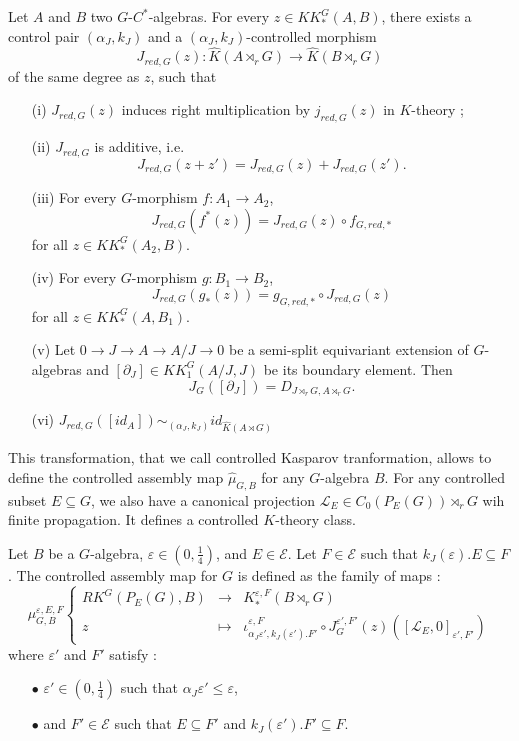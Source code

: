 \begin{prop}
Let $A$ and $B$ two $G$-$C^*$-algebras. For every $z\in KK^G_*(A,B)$, there exists a control pair $(\alpha_J,k_J)$ and a $(\alpha_J,k_J)$-controlled morphism
\[J_{red,G}(z) : \hat K(A\rtimes_r G)\rightarrow \hat K(B\rtimes_r G)\]
of the same degree as $z$, such that
\begin{enumerate}
\item[(i)] $J_{red,G}(z)$ induces right multiplication by $j_{red,G}(z)$ in $K$-theory ;
\item[(ii)] $J_{red,G}$ is additive, i.e.
\[J_{red,G}(z+z')=J_{red,G}(z)+J_{red,G}(z').\]
\item[(iii)] For every $G$-morphism $f : A_1\rightarrow A_2$,
\[J_{red,G}(f^*(z))=J_{red,G}(z)\circ f_{G,red,*}\] for all $z\in KK_*^G(A_2,B)$.
\item[(iv)] For every $G$-morphism $g : B_1\rightarrow B_2$,
\[J_{red,G}(g_*(z))= g_{G,red,*}\circ J_{red,G}(z)\] for all $z\in KK_*^G(A,B_1)$.
\item[(v)] Let $0\rightarrow J\rightarrow A\rightarrow A/J\rightarrow 0$ be a semi-split equivariant extension of $G$-algebras and $[\partial_J]\in KK_1^G(A/J,J)$ be its boundary element. Then 
\[J_G([\partial_J])=D_{J\rtimes_r G,A\rtimes_rG}.\] 
\item[(vi)] $J_{red,G}([id_A]) \sim_{(\alpha_J,k_J)} id_{\hat K(A\rtimes G)}$
\end{enumerate}
\end{prop} 

This transformation, that we call controlled Kasparov tranformation, allows to define the controlled assembly map $\hat\mu_{G,B}$ for any $G$-algebra $B$. For any controlled subset $E\subseteq G$, we also have a canonical projection $\mathcal L_E\in C_0(P_E(G))\rtimes_r G$ wih finite propagation. It defines a controlled $K$-theory class.

\begin{definition}
Let $B$ be a $G$-algebra, $\varepsilon\in (0,\frac{1}{4})$, and $E\in\mathcal E$. Let $F\in \mathcal E$ such that $k_J(\varepsilon).E \subseteq F$. The controlled assembly map for $G$ is defined as the family of maps :
\[\mu_{G,B}^{\varepsilon,E,F}\left\{
\begin{array}{rcl}
RK^G(P_E(G), B) & \rightarrow & K_*^{\varepsilon, F}(B\rtimes_r G)\\
z & \mapsto & \iota_{\alpha_J\varepsilon', k_J(\varepsilon').F'}^{\varepsilon,F} \circ J_G^{\varepsilon', F'}(z)([\mathcal L_E,0]_{\varepsilon' , F'})
\end{array}\right.\]
where $\varepsilon'$ and $F'$ satisfy :
\begin{itemize}
\item[$\bullet$] $\varepsilon'\in (0,\frac{1}{4})$ such that $\alpha_J \varepsilon'\leq \varepsilon$,
\item[$\bullet$] and $F'\in\mathcal E$ such that $E\subseteq F'$ and $k_J(\varepsilon').F'\subseteq F$.
\end{itemize}
\end{definition}

